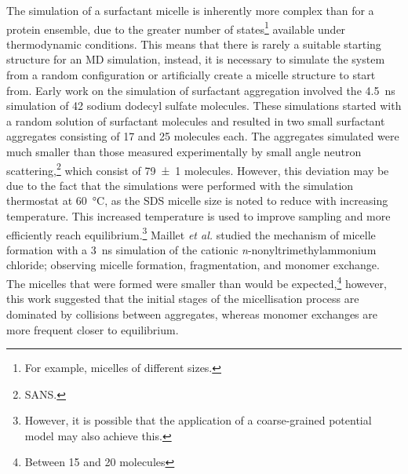The simulation of a surfactant micelle is inherently more complex than for a protein ensemble, due to the greater number of states\footnote{For example, micelles of different sizes.} available under thermodynamic conditions.
This means that there is rarely a suitable starting structure for an MD simulation, instead, it is necessary to simulate the system from a random configuration or artificially create a micelle structure to start from.
Early work on the simulation of surfactant aggregation involved the \SI{4.5}{\nano\second} simulation of 42 sodium dodecyl sulfate molecules.
These simulations started with a random solution of surfactant molecules and resulted in two small surfactant aggregates consisting of 17 and 25 molecules each.
The aggregates simulated were much smaller than those measured experimentally by small angle neutron scattering,\footnote{SANS.} which consist of \num{79\pm1} molecules.
However, this deviation may be due to the fact that the simulations were performed with the simulation thermostat at \SI{60}{\celsius}, as the SDS micelle size is noted to reduce with increasing temperature.
This increased temperature is used to improve sampling and more efficiently reach equilibrium.\footnote{However, it is possible that the application of a coarse-grained potential model may also achieve this.}
Maillet \emph{et al.} studied the mechanism of micelle formation with a \SI{3}{\nano\second} simulation of the cationic \emph{n}-nonyltrimethylammonium chloride; observing micelle formation, fragmentation, and monomer exchange.
The micelles that were formed were smaller than would be expected,\footnote{Between \num{15} and \num{20} molecules} however, this work suggested that the initial stages of the micellisation process are dominated by collisions between aggregates, whereas monomer exchanges are more frequent closer to equilibrium.

